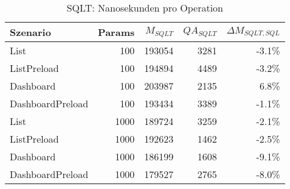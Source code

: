 
\begin{table}[ht]
\centering
\caption{SQLT: Nanosekunden pro Operation}
\begin{tabular}{lrrrr}
\toprule
Szenario & Params & ${M_{SQLT}}$ & ${QA_{SQLT}}$ & ${\Delta M_{SQLT,SQL}}$  \\
\midrule

	List & 100 & 193054 & 3281 & -3.1\% \\
	ListPreload & 100 & 194894 & 4489 & -3.2\% \\
	Dashboard & 100 & 203987 & 2135 & 6.8\% \\
	DashboardPreload & 100 & 193434 & 3389 & -1.1\% \\
	List & 1000 & 189724 & 3259 & -2.1\% \\
	ListPreload & 1000 & 192623 & 1462 & -2.5\% \\
	Dashboard & 1000 & 186199 & 1608 & -9.1\% \\
	DashboardPreload & 1000 & 179527 & 2765 & -8.0\% \\
\bottomrule
\end{tabular}
\label{tab:benchmark_sqlt_nsperop}
\end{table}
	